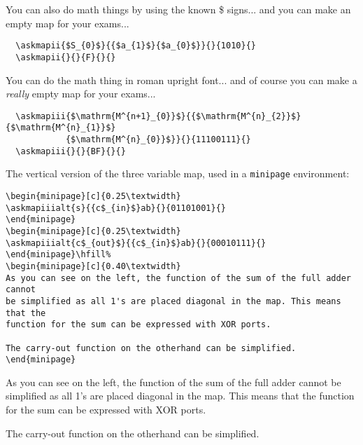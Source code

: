 \documentclass[a4paper,10pt]{ltxdoc}
\begin{document}
You can also do math things by using the known \$ signs... and you can make an
empty map for your exams...
\begin{verbatim}
  \askmapii{$S_{0}$}{{$a_{1}$}{$a_{0}$}}{}{1010}{}
  \askmapii{}{}{F}{}{}
\end{verbatim}
\bigskip\bigskip

You can do the math thing in roman upright font... and of course you can make
a \textsl{really} empty map for your exams...
\begin{verbatim}
  \askmapiii{$\mathrm{M^{n+1}_{0}}$}{{$\mathrm{M^{n}_{2}}$}{$\mathrm{M^{n}_{1}}$}
            {$\mathrm{M^{n}_{0}}$}}{}{11100111}{}
  \askmapiii{}{}{BF}{}{}
\end{verbatim}
\bigskip\bigskip

The vertical version of the three variable map, used in a \verb|minipage|
environment:
\begin{verbatim}
\begin{minipage}[c]{0.25\textwidth}
\askmapiiialt{s}{{c$_{in}$}ab}{}{01101001}{}
\end{minipage}
\begin{minipage}[c]{0.25\textwidth}
\askmapiiialt{c$_{out}$}{{c$_{in}$}ab}{}{00010111}{}
\end{minipage}\hfill%
\begin{minipage}[c]{0.40\textwidth}
As you can see on the left, the function of the sum of the full adder cannot
be simplified as all 1's are placed diagonal in the map. This means that the
function for the sum can be expressed with XOR ports.

The carry-out function on the otherhand can be simplified.
\end{minipage}
\end{verbatim}

\begin{minipage}[c]{0.25\textwidth}
\end{minipage}
\begin{minipage}[c]{0.25\textwidth}
\end{minipage}\hfill%
\begin{minipage}[c]{0.40\textwidth}
As you can see on the left, the function of the sum of the full adder cannot
be simplified as all 1's are placed diagonal in the map. This means that the
function for the sum can be expressed with XOR ports.

The carry-out function on the otherhand can be simplified.
\end{minipage}
\end{document}
